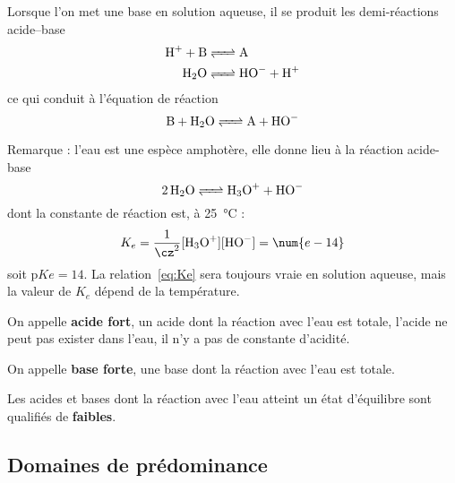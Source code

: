 \documentclass{cours}
\begin{document}
Lorsque l'on met une base  en solution aqueuse, il se produit les demi-réactions acide--base 
\begin{align}
  \ce{H+ + B} &\ce{<=> A}\\
  \ce{H2O} &\ce{<=> HO- + H+}
\end{align}
ce qui conduit à l'équation de réaction
\begin{equation}
  \ce{B + H2O <=> A + HO-}
\end{equation}

Remarque : l'eau est une espèce amphotère, elle donne lieu à la réaction acide-base
\begin{equation}
  \ce{2H2O <=> H3O+ + HO-}
\end{equation}
dont la constante de réaction est, à \SI{25}{\celsius} :  
\begin{equation}
  K_e = \frac{1}{\cz^2}[\ce{H3O+}][\ce{HO-}] = \num{e-14}
  \label{eq:Ke}
\end{equation}
soit $\mathrm{p}Ke = 14$. La relation~\eqref{eq:Ke} sera toujours vraie en solution aqueuse, mais la valeur de $K_e$ dépend de la température. 

\begin{definition}
  On appelle \textbf{acide fort}, un acide dont la réaction avec l'eau est totale, l'acide ne peut pas exister dans l'eau, il n'y a pas de constante d'acidité.

  On appelle \textbf{base forte}, une base dont la réaction avec l'eau est totale. 

  Les acides et bases dont la réaction avec l'eau atteint un état d'équilibre sont qualifiés de \textbf{faibles}.
\end{definition}

\subsection{Domaines de prédominance}%
\label{sub:domaines_de_predominance}
\end{document}
